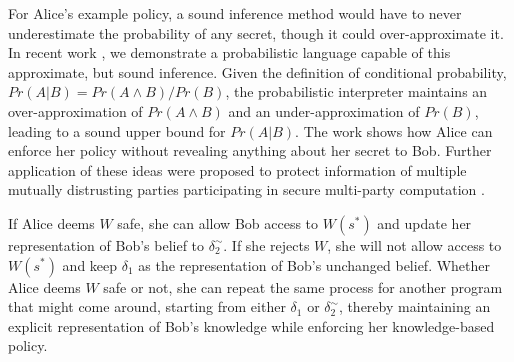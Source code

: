 \documentclass{article} %
\newcommand{\pxm}[1]{\textcolor{red}{PM -- #1}}
\newcommand{\asecret}[0]{s}
\newcommand{\rsecret}[0]{\asecret^*}
\newcommand{\sconst}[1]{\ensuremath{\mathsf{#1}}}
\newcommand{\strue}{\sconst{True}}
\newcommand{\sfalse}{\sconst{False}}
\newcommand{\paren}[1]{\left( #1 \right)}
\newcommand{\acond}[0]{|^\sim}
\newcommand{\stacklabel}[1]{\stackrel{\smash{\scriptscriptstyle \mathrm{#1}}}}
\newcommand{\defeq}{\stacklabel{def}=}
\theoremstyle{plain} %
\theoremstyle{definition} %
\begin{document}
For Alice's example policy, a sound inference method would have to
never underestimate the probability of any secret, though it could
over-approximate it. In recent work \cite{mardziel11belief}, we
demonstrate a probabilistic language capable of this approximate, but
sound inference. Given the definition of conditional probability, $
Pr(A | B) = Pr(A \wedge B) / Pr(B) $, the probabilistic interpreter
maintains an over-approximation of $ Pr(A \wedge B) $ and an
under-approximation of $ Pr(B) $, leading to a sound upper bound for $
Pr(A | B) $. The work shows how Alice can enforce her policy
without revealing anything about her secret to Bob. Further application
of these ideas were proposed to protect information of multiple
mutually distrusting parties participating in secure multi-party
computation \cite{mardziel12smc}.

%
%

%

If Alice deems $ W $ safe, she can allow Bob access to $ W(\rsecret) $
and update her representation of Bob's belief to $ \delta_2^\sim $. If
she rejects $ W $, she will not allow access to $ W(\rsecret) $ and
keep $ \delta_1 $ as the representation of Bob's unchanged
belief. Whether Alice deems $ W $ safe or not, she can repeat the same
process for another program that might come around, starting from
either $ \delta_1 $ or $ \delta_2^\sim $, thereby maintaining an
explicit representation of Bob's knowledge while enforcing her
knowledge-based policy.
\end{document}
